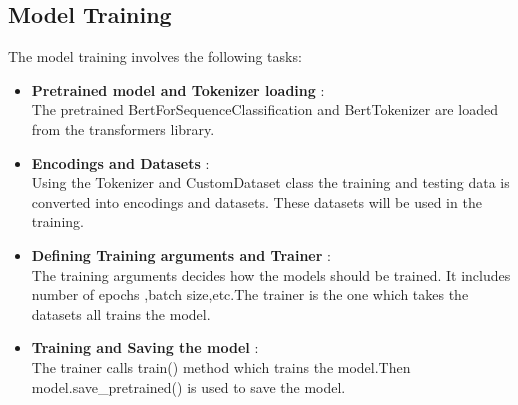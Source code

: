 \documentclass[titlepage]{article}
\begin{document}
\subsection{Model Training}
The model training involves the following tasks:
\begin{itemize}
    \item  \textbf{Pretrained model and Tokenizer loading} : \\
    The pretrained BertForSequenceClassification and BertTokenizer are loaded from the transformers library.\\
    
    \item \textbf{Encodings and Datasets} :\\
    Using the Tokenizer and CustomDataset class the training and testing data is converted into encodings and datasets. These datasets will be used in the training. \\

    \item \textbf{Defining Training arguments and Trainer} : \\
    The training arguments decides how the models should be trained. It includes number of epochs ,batch size,etc.The trainer is the one which takes the datasets all trains the model. \\
    
    \item  \textbf{Training and Saving the model} : \\
    The trainer calls train() method which trains the model.Then model.save\_pretrained() is used to save the model.\\
\end{itemize}
\end{document}
